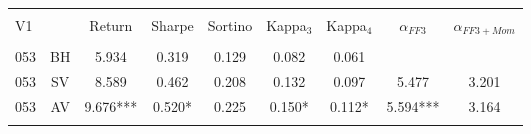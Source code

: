 
\begin{tabular}{@{\extracolsep{5pt}} Hcccccccc} 
\\[-1.8ex]\hline 
\hline \\[-1.8ex] 
V1 &  & Return & Sharpe & Sortino & Kappa$_{3}$ & Kappa$_{4}$ & $\alpha_{FF3}$ & $\alpha_{FF3+Mom}$ \\ 
\hline \\[-1.8ex] 
053 & BH & 5.934 & 0.319 & 0.129 & 0.082 & 0.061 &  &  \\ 
053 & SV & 8.589 & 0.462 & 0.208 & 0.132 & 0.097 & 5.477 & 3.201 \\ 
053 & AV & 9.676*** & 0.520* & 0.225 & 0.150* & 0.112* & 5.594*** & 3.164 \\ 
\hline \\[-1.8ex] 
\end{tabular} 
